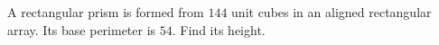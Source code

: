 A rectangular prism is formed from $144$ unit cubes in an aligned rectangular array. Its base perimeter is $54$. Find its height.
